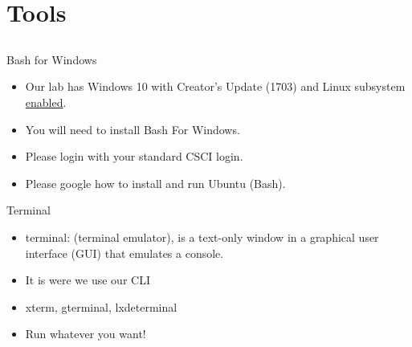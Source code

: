 \documentclass{beamer}
\begin{document}

\section{Tools}
\subsection{}

\begin{frame}{Bash for Windows}
\begin{itemize}
\item Our lab has Windows 10 with Creator's Update (1703) and Linux subsystem \underline{enabled}.
\item You will need to install Bash For Windows.
\item Please login with your standard CSCI login.
\item Please google how to install and run Ubuntu (Bash).
\end{itemize}
\end{frame}

\begin{frame}{Terminal}
\begin{itemize}
\item terminal: (terminal emulator), is a text-only window in a graphical user interface (GUI) that emulates a console. 
\item It is were we use our CLI
\item xterm, gterminal, lxdeterminal
\item Run whatever you want!
\end{itemize}
\end{frame}
\end{document}
